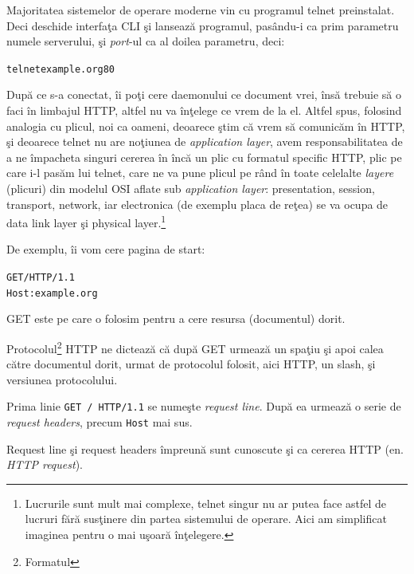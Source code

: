 Majoritatea sistemelor de operare moderne vin cu programul telnet preinstalat.
Deci deschide interfaţa CLI şi lansează programul, pasându-i ca prim parametru numele
serverului, şi \textit{port}-ul ca al doilea parametru, deci:
\begin{alltt}
telnet example.org 80
\end{alltt}
După ce s-a conectat, îi poţi cere daemonului ce document vrei, însă trebuie
să o faci în limbajul HTTP, altfel nu va {\glqq}înţelege{\grqq} ce vrem de la el.
Altfel spus, folosind analogia cu plicul, noi ca oameni, deoarece
ştim că vrem să comunicăm în HTTP, şi deoarece telnet nu are noţiunea
de \textit{application layer}, avem responsabilitatea de a ne
{\glqq}împacheta{\grqq} singuri cererea în încă un plic cu formatul specific HTTP,
plic pe care i-l pasăm lui telnet, care ne va pune plicul
pe rând în toate celelalte \textit{layere} ({\glqq}plicuri{\grqq}) din modelul OSI aflate
sub \textit{application layer}: presentation, session, transport, network, iar
electronica (de exemplu placa de reţea) se va ocupa de data link layer şi
physical layer.\footnote{Lucrurile sunt mult mai complexe, telnet
singur nu ar putea face astfel de lucruri fără susţinere
din partea sistemului de operare. Aici am simplificat imaginea
pentru o mai uşoară înţelegere.}

De exemplu, îi vom cere
pagina de start:
\begin{alltt}
GET / HTTP/1.1\Return
Host: example.org\Return
\Return
\end{alltt}
GET este  pe care o folosim
pentru a cere resursa (documentul) dorit.

Protocolul\footnote{Formatul} HTTP ne dictează că după GET urmează un spaţiu
şi apoi calea către documentul dorit, urmat de protocolul folosit, aici HTTP, un
slash, şi versiunea protocolului.

Prima linie \texttt{GET / HTTP/1.1} se numeşte \textsl{request line}.
După ea urmează o serie de \textsl{request headers}, precum \texttt{Host} mai sus.

Request line şi request headers împreună sunt cunoscute şi ca cererea HTTP (en.
\textsl{HTTP request}).
	
